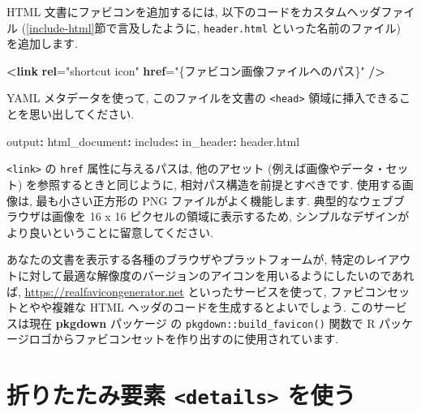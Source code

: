 \documentclass[
  11pt,
  lualatex,ja=standard,jafont=noto]{bxjsreport}
\newenvironment{Shaded}{\begin{snugshade}}{\end{snugshade}}
\newcommand{\AttributeTok}[1]{\textcolor[rgb]{0.77,0.63,0.00}{#1}}
\newcommand{\ErrorTok}[1]{\textcolor[rgb]{0.64,0.00,0.00}{\textbf{#1}}}
\newcommand{\FunctionTok}[1]{\textcolor[rgb]{0.00,0.00,0.00}{#1}}
\newcommand{\KeywordTok}[1]{\textcolor[rgb]{0.13,0.29,0.53}{\textbf{#1}}}
\newcommand{\OtherTok}[1]{\textcolor[rgb]{0.56,0.35,0.01}{#1}}
\newcommand{\StringTok}[1]{\textcolor[rgb]{0.31,0.60,0.02}{#1}}
\begin{document}
HTML 文書にファビコンを追加するには, 以下のコードをカスタムヘッダファイル (\ref{include-html}節で言及したように, \texttt{header.html} といった名前のファイル) を追加します.

\begin{Shaded}
\begin{Highlighting}[]
\KeywordTok{\textless{}link} \ErrorTok{rel}\OtherTok{=}\StringTok{"shortcut icon"} \ErrorTok{href}\OtherTok{=}\StringTok{"\{ファビコン画像ファイルへのパス\}"} \KeywordTok{/\textgreater{}}
\end{Highlighting}
\end{Shaded}

YAML メタデータを使って, このファイルを文書の \texttt{\textless{}head\textgreater{}} 領域に挿入できることを思い出してください.

\begin{Shaded}
\begin{Highlighting}[]
\FunctionTok{output}\KeywordTok{:}
\AttributeTok{  }\FunctionTok{html\_document}\KeywordTok{:}
\AttributeTok{    }\FunctionTok{includes}\KeywordTok{:}
\AttributeTok{      }\FunctionTok{in\_header}\KeywordTok{:}\AttributeTok{ header.html}
\end{Highlighting}
\end{Shaded}

\texttt{\textless{}link\textgreater{}} の \texttt{href} 属性に与えるパスは, 他のアセット (例えば画像やデータ・セット) を参照するときと同じように, 相対パス構造を前提とすべきです. 使用する画像は, 最も小さい正方形の PNG ファイルがよく機能します. 典型的なウェブブラウザは画像を 16 x 16 ピクセルの領域に表示するため, シンプルなデザインがより良いということに留意してください.

あなたの文書を表示する各種のブラウザやプラットフォームが, 特定のレイアウトに対して最適な解像度のバージョンのアイコンを用いるようにしたいのであれば, \url{https://realfavicongenerator.net} といったサービスを使って, ファビコンセットとやや複雑な HTML ヘッダのコードを生成するとよいでしょう. このサービスは現在 \textbf{pkgdown} パッケージ \autocite{R-pkgdown} の \texttt{pkgdown::build\_favicon()} 関数で R パッケージロゴからファビコンセットを作り出すのに使用されています.

\hypertarget{details-tag}{%
\section{\texorpdfstring{折りたたみ要素 \texttt{\textless{}details\textgreater{}} を使う}{折りたたみ要素 \textless details\textgreater{} を使う}}\label{details-tag}}
\end{document}
